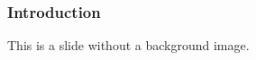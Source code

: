 \documentclass[aspectratio=1610]{beamer}
\begin{document}
\CustomTitlePage
\usebackgroundtemplate{}

\begin{frame}
    \frametitle{Introduction}
    This is a slide without a background image.
\end{frame}

\CustomEndPage
\end{document}
